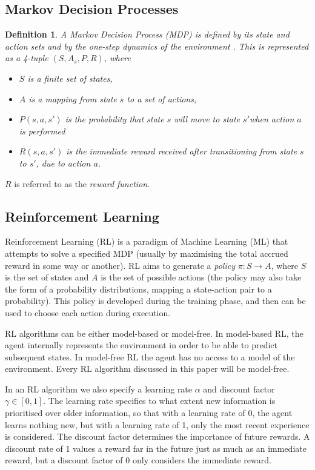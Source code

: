 \newtheorem{definition}{Definition}[subsection]


\subsection{Markov Decision Processes}
\begin{definition}

A Markov Decision Process (MDP) is defined by its state and action sets and by the one-step dynamics of the environment \cite{RLAnIntro}. This is represented as a 4-tuple $(S, A_{s}, P, R)$, where
\begin{itemize}
  \item $S$ is a finite set of states,
  \item $A$ is a mapping from state $s$ to a set of actions,
  \item $P(s, a, s')$ is the probability that state $s$ will move to state $s'$when action $a$ is performed
  \item $R(s, a, s')$ is the immediate reward received after transitioning from state $s$ to $s'$, due to action $a$.
\end{itemize}  

\end{definition}
$R$ is referred to as the \textit{reward function}. 

\subsection{Reinforcement Learning}
Reinforcement Learning (RL) is a paradigm of Machine Learning (ML) that attempts to solve a specified MDP (usually by maximising the total accrued reward in some way or another). RL aims to generate a \textit{policy} $\pi : S \to A$, where $S$ is the set of states and $A$ is the set of possible actions (the policy may also take the form of a probability distributions, mapping a state-action pair to a probability). This policy is developed during the training phase, and then can be used to choose each action during execution.

RL algorithms can be either model-based or model-free. In model-based RL, the agent internally represents the environment in order to be able to predict subsequent states. In model-free RL the agent has no access to a model of the environment. Every RL algorithm discussed in this paper will be model-free.

In an RL algorithm we also specify a learning rate $\alpha$ and discount factor $\gamma \in [0,1]$. The learning rate specifies to what extent new information is prioritised over older information, so that with a learning rate of 0, the agent learns nothing new, but with a learning rate of 1, only the most recent experience is considered. The discount factor determines the importance of future rewards. A discount rate of 1 values a reward far in the future just as much as an immediate reward, but a discount factor of 0 only considers the immediate reward.

